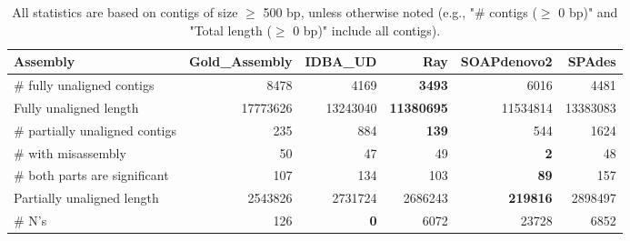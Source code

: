 \documentclass[12pt,a4paper]{article}
\begin{document}
\begin{table}[ht]
\begin{center}
\caption{All statistics are based on contigs of size $\geq$ 500 bp, unless otherwise noted (e.g., "\# contigs ($\geq$ 0 bp)" and "Total length ($\geq$ 0 bp)" include all contigs).}
\begin{tabular}{|l*{5}{|r}|}
\hline
Assembly & Gold\_Assembly & IDBA\_UD & Ray & SOAPdenovo2 & SPAdes \\ \hline
\# fully unaligned contigs & 8478 & 4169 & {\bf 3493} & 6016 & 4481 \\ \hline
Fully unaligned length & 17773626 & 13243040 & {\bf 11380695} & 11534814 & 13383083 \\ \hline
\# partially unaligned contigs & 235 & 884 & {\bf 139} & 544 & 1624 \\ \hline
\hspace{5mm}\# with misassembly & 50 & 47 & 49 & {\bf 2} & 48 \\ \hline
\hspace{5mm}\# both parts are significant & 107 & 134 & 103 & {\bf 89} & 157 \\ \hline
Partially unaligned length & 2543826 & 2731724 & 2686243 & {\bf 219816} & 2898497 \\ \hline
\# N's & 126 & {\bf 0} & 6072 & 23728 & 6852 \\ \hline
\end{tabular}
\end{center}
\end{table}
\end{document}

